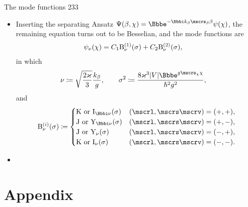 \documentclass[9pt]{beamer}
\begin{document}
\begin{frame}%
{The mode functions}%
{233}
\begin{itemize}
\item
Inserting the separating Ansatz $\rfun{\Psi}{\beta,\chi} =
\ee^{-\ii k_\beta\mscrs_\beta\beta}\rfun{\psi}{\chi}$, the remaining
equation turns out to be Besselian, and the mode functions are
\begin{align}
{\psi_\nu}\mathopen{}\left(\chi\right)\mathclose{} &= 
C_1{\mathrm{B}_{\nu}^{(1)}}\mathopen{}\left(\sigma\right)\mathclose{}
+C_2{\mathrm{B}_{\nu}^{(2)}}\mathopen{}\left(\sigma\right)\mathclose{},
\end{align}
in which
\begin{align}
\nu &\coloneqq \sqrt{\frac{2\varkappa}{3}}\frac{k_\beta}{g},\qquad
\sigma^2 \coloneqq 
\frac{8\varkappa^3\vbr{V}\ee^{g\mscrs_\chi\chi}}{\hslash^2 g^2},
\label{eq:trsf-quantum-sigma}
\end{align}
and
\begin{align}
\rfun{\mathrm{B}^{(i)}_{\nu}}{\sigma} \coloneqq
\begin{cases}
\mathrm{K}\text{ or }\rfun{\mathrm{I}_{\ii\nu}}{\sigma}
& \rbr{\mscrl, \mscrs\mscrv} = \rbr{+,+}, \\
\mathrm{J}\text{ or }\rfun{\mathrm{Y}_{\ii\nu}}{\sigma}
& \rbr{\mscrl, \mscrs\mscrv} = \rbr{+,-}, \\
\mathrm{J}\text{ or }\rfun{\mathrm{Y}_{\nu}}{\sigma}
& \rbr{\mscrl, \mscrs\mscrv} = \rbr{-,+}, \\
\mathrm{K}\text{ or }\rfun{\mathrm{I}_{\nu}}{\sigma}
& \rbr{\mscrl, \mscrs\mscrv} = \rbr{-,-}. \\
\end{cases}
\end{align}
\end{itemize}
\end{frame}

\begin{itemize}
\item
\end{itemize}

\section*{Appendix}
\end{document}
